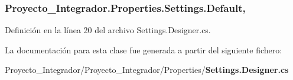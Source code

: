 \subsubsection[{Default}]{ Proyecto\-\_\-\-Integrador.\-Properties.\-Settings.\-Default\hspace{0.3cm}{\ttfamily [static]}, {\ttfamily [get]}}\label{class_proyecto___integrador_1_1_properties_1_1_settings_a13fe3932ab14f7cffe6778251d5f9ab4}


Definición en la línea 20 del archivo Settings.\-Designer.\-cs.



La documentación para esta clase fue generada a partir del siguiente fichero\-:\begin{DoxyCompactItemize}
\item 
Proyecto\-\_\-\-Integrador/\-Proyecto\-\_\-\-Integrador/\-Properties/{\bf Settings.\-Designer.\-cs}\end{DoxyCompactItemize}
